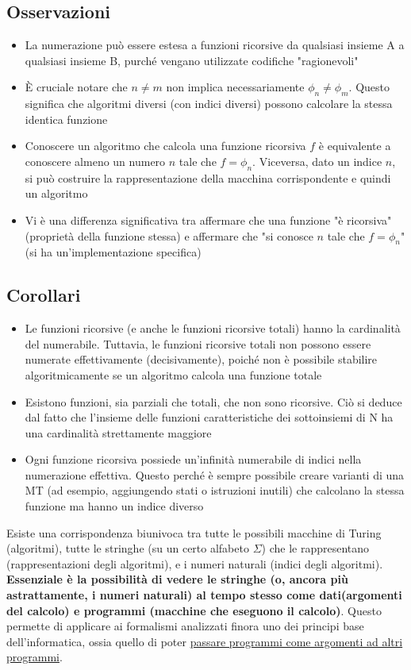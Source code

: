 \documentclass[12pt, a4paper]{report}
\begin{document}
            \subsection{Osservazioni}
            \begin{itemize}
                \item La numerazione può essere estesa a funzioni ricorsive da qualsiasi insieme A a qualsiasi insieme B, purché vengano utilizzate codifiche "ragionevoli"
                \item È cruciale notare che $n \neq m$ non implica necessariamente $\phi_n \neq \phi_m$. Questo significa che algoritmi diversi (con indici diversi) possono calcolare la stessa identica funzione
                \item Conoscere un algoritmo che calcola una funzione ricorsiva $f$ è equivalente a conoscere almeno un numero $n$ tale che $f = \phi_n$. Viceversa, dato un indice $n$, si può costruire la rappresentazione della macchina corrispondente e quindi un algoritmo
                \item Vi è una differenza significativa tra affermare che una funzione "è ricorsiva" (proprietà della funzione stessa) e affermare che "si conosce $n$ tale che $f = \phi_n$" (si ha un'implementazione specifica)
            \end{itemize}
            \subsection{Corollari}
            \begin{itemize}
                \item Le funzioni ricorsive (e anche le funzioni ricorsive totali) hanno la cardinalità del numerabile. Tuttavia, le funzioni ricorsive totali non possono essere numerate effettivamente (decisivamente), poiché non è possibile stabilire algoritmicamente se un algoritmo calcola una funzione totale
                \item Esistono funzioni, sia parziali che totali, che non sono ricorsive. Ciò si deduce dal fatto che l'insieme delle funzioni caratteristiche dei sottoinsiemi di N ha una cardinalità strettamente maggiore
                \item Ogni funzione ricorsiva possiede un'infinità numerabile di indici nella numerazione effettiva. Questo perché è sempre possibile creare varianti di una MT (ad esempio, aggiungendo stati o istruzioni inutili) che calcolano la stessa funzione ma hanno un indice diverso
            \end{itemize}
            Esiste una corrispondenza biunivoca tra tutte le possibili macchine di Turing (algoritmi), tutte le stringhe (su un certo alfabeto $\Sigma$) che le rappresentano (rappresentazioni degli algoritmi), e i numeri naturali (indici degli algoritmi). \textbf{Essenziale è la possibilità di vedere le stringhe (o, ancora più astrattamente, i numeri naturali) al tempo stesso come dati(argomenti del calcolo) e programmi (macchine che eseguono il calcolo)}. Questo permette di applicare ai formalismi analizzati finora uno dei principi base dell'informatica, ossia quello di poter \underline{passare programmi come argomenti ad altri programmi}.
\end{document}
